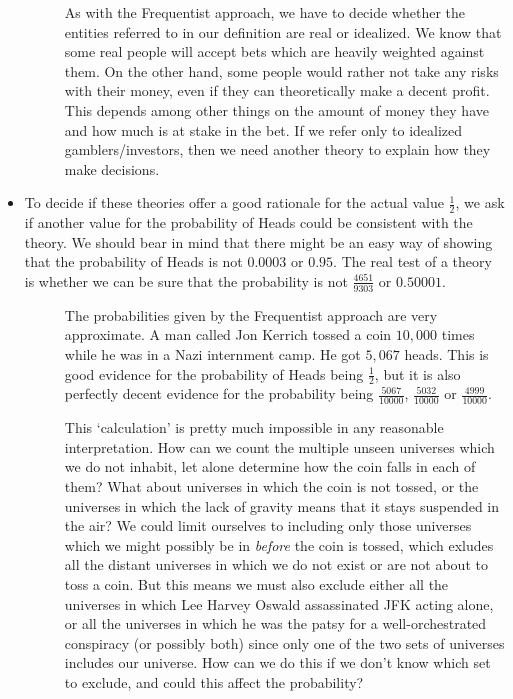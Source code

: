 \begin{itemize}
\begin{description}
\item[]

\item[]
As with the Frequentist approach, we have to decide whether the entities referred to in our definition are real or idealized. We know that some real people will accept bets which are heavily weighted against them. On the other hand, some people would rather not take any risks with their money, even if they can theoretically make a decent profit. This depends among other things on the amount of money they have and how much is at stake in the bet. If we refer only to idealized gamblers/investors, then we need another theory to explain how they make decisions. 
\end{description}
\item
To decide if these theories offer a good rationale for the actual value $\frac{1}{2}$, we ask if another value for the probability of Heads could be consistent with the theory. We should bear in mind that there might be an easy way of showing that the probability of Heads is not $0.0003$ or $0.95$. The real test of a theory is whether we can be sure that the probability is not $\frac{4651}{9303}$ or $0.50001$.
\begin{description}
\item[]
The probabilities given by the Frequentist approach are very approximate. A man called Jon Kerrich tossed a coin $10,000$ times while he was in a Nazi internment camp. He got $5,067$ heads. This is good evidence for the probability of Heads being $\frac{1}{2}$, but it is also perfectly decent evidence for the probability being $\frac{5067}{10000}$, $\frac{5032}{10000}$ or $\frac{4999}{10000}$.
\item[]

\item[]
This `calculation' is pretty much impossible in any reasonable interpretation. How can we count the multiple unseen universes which we do not inhabit, let alone determine how the coin falls in each of them? What about universes in which the coin is not tossed, or the universes in which the lack of gravity means that it stays suspended in the air? We could limit ourselves to including only those universes which we might possibly be in \emph{before} the coin is tossed, which exludes all the distant universes in which we do not exist or are not about to toss a coin. But this means we must also exclude either all the universes in which Lee Harvey Oswald assassinated JFK acting alone, or all the universes in which he was the patsy for a well-orchestrated conspiracy (or possibly both) since only one of the two sets of universes includes our universe. How can we do this if we don't know which set to exclude, and could this affect the probability?



\end{description}
\end{itemize}
